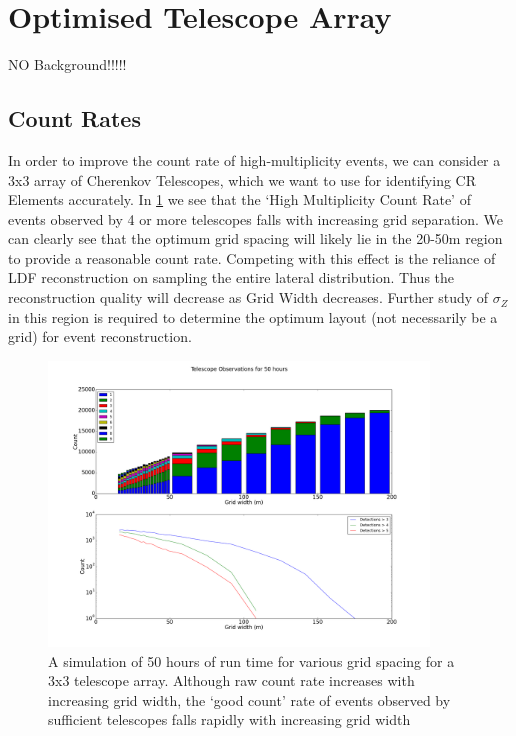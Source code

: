\documentclass{article}
\begin{document}
\section{Optimised Telescope Array}
NO Background!!!!!
\subsection{Count Rates}

In order to improve the count rate of high-multiplicity events, we can consider a 3x3 array of Cherenkov Telescopes, which we want to use for identifying CR Elements accurately. In \ref{fig:optmiselayout} we see that the \textquoteleft High Multiplicity Count Rate' of events observed by 4 or more telescopes falls with increasing grid separation. We can clearly see that the optimum grid spacing will likely lie in the 20-50m region to provide a reasonable count rate. Competing with this effect is the reliance of LDF reconstruction on sampling the entire lateral distribution. Thus the reconstruction quality will decrease as Grid Width decreases. Further study of $\sigma_{Z}$ in this region is required to determine the optimum layout (not necessarily be a grid) for event reconstruction. 

\begin{figure}
\begin{center}
\includegraphics[width=0.9\textwidth]{optimiselayout}
\caption{A simulation of 50 hours of run time for various grid spacing for a 3x3 telescope array. Although raw count rate increases with increasing grid width, the \textquoteleft good count' rate of events observed by sufficient telescopes falls rapidly with increasing grid width}
\label{fig:optmiselayout}
\end{center}
\end{figure}
\end{document}
